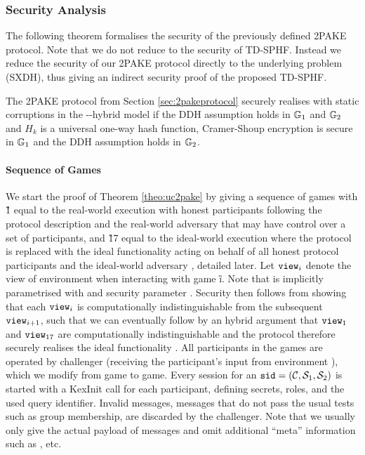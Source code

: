 \subsubsection{Security Analysis}\label{sec:2pakeproof}
The following theorem formalises the security of the previously defined \ac{2PAKE} protocol.
Note that we do not reduce to the security of \ac{TD-SPHF}.
Instead we reduce the security of our \ac{2PAKE} protocol directly to the underlying problem (\ac{SXDH}), thus giving an indirect security proof of the proposed \ac{TD-SPHF}.
 
\begin{theorem}\label{theo:uc2pake}
  The \ac{2PAKE} protocol from Section \ref{sec:2pakeprotocol} securely realises \FTWOPAKEM with static corruptions in the \Fcrs-\Fca-hybrid model if the \ac{DDH} assumption holds in $\mathbb{G}_1$ and $\mathbb{G}_2$ and $H_k$ is a universal one-way hash function, \ie Cramer-Shoup encryption is secure in $\mathbb{G}_1$ and the \ac{DDH} assumption holds in $\mathbb{G}_2$.
\end{theorem}

\paragraph{Sequence of Games}
We start the proof of Theorem \ref{theo:uc2pake} by giving a sequence of games with \G{1} equal to the real-world execution with honest participants following the protocol description and the real-world adversary \cA that may have control over a set of participants, and \G{17} equal to the ideal-world execution where the protocol is replaced with the ideal functionality \FTWOPAKE acting on behalf of all honest protocol participants and the ideal-world adversary \SIM, detailed later.
Let $\mathtt{view}_i$ denote the view of environment \cZ when interacting with game \G{i}.
Note that \view is implicitly parametrised with \sid and security parameter \secpar.
Security then follows from showing that each $\mathtt{view}_i$ is computationally indistinguishable from the subsequent $\mathtt{view}_{i+1}$, such that we can eventually follow by an hybrid argument that $\mathtt{view}_1$ and $\mathtt{view}_{17}$ are computationally indistinguishable and the protocol therefore securely realises the ideal functionality \FTWOPAKE.
All participants in the games are operated by challenger \Challenger (receiving the participant's input from environment \cZ), which we modify from game to game.
Every session for an $\mathtt{sid}=(\mathcal{C}, \mathcal{S}_1, \mathcal{S}_2)$ is started with a KexInit call for each participant, defining secrets, roles, and the used query identifier.
Invalid messages, \ie messages that do not pass the usual tests such as group membership, are discarded by the challenger.
Note that we usually only give the actual payload of messages and omit additional ``meta'' information such as \sid, \qid etc.

